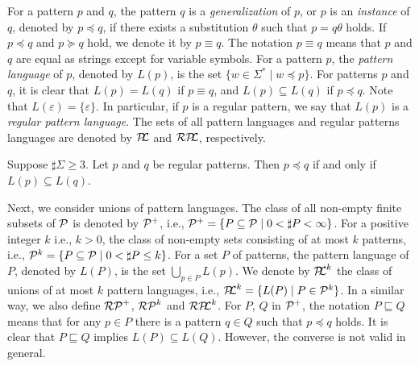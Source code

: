 For a pattern $p$ and $q$,
the pattern $q$ is a \textit{generalization} of $p$, or $p$ is an \textit{instance} of $q$, denoted by $p \preceq q$,
if there exists a substitution $\theta$ such that $p = q\theta$ holds.
If $p \preceq q$ and $p \succeq q$ hold, we denote it by $p \equiv q$.
The notation $p \equiv q$ means that $p$ and $q$ are equal as strings except for variable symbols. 
For a pattern $p$, the \textit{pattern language} of $p$, denoted by $L(p)$, is the set $\{w \in \Sigma^{\ast} \mid w \preceq p\}$.
For patterns $p$ and $q$, it is clear that $L(p) = L(q)$ if $p \equiv q$, and $L(p) \subseteq L(q)$ if $p \preceq q$.
Note that $L(\varepsilon) = \{\varepsilon\}$.
In particular, if $p$ is a regular pattern, we say that $L(p)$ is a \textit{regular pattern language}.
The sets of all pattern languages and regular patterns languages are denoted by $\mathcal{P\!\!L}$ and $\mathcal{RP\!\!L}$, respectively.

\begin{lem}\label{regularPatternEquivalence}
  Suppose $\sharp \Sigma \geq 3$. Let $p$ and $q$ be regular patterns.
  Then $p \preceq q$ if and only if $L(p) \subseteq L(q)$.
\end{lem}

Next, we consider unions of pattern languages. %
The class of all non-empty finite subsets of $\mathcal{P}$ is denoted by $\mathcal{P}^{+}$, i.e.,
$\mathcal{P}^{+} = \{P \subseteq \mathcal{P} \mid 0 < \sharp P < \infty\}$.
For a positive integer $k$ i.e., $k>0$, the class of non-empty sets consisting of at most $k$ patterns, i.e.,
$\mathcal{P}^{k} = \{P \subseteq \mathcal{P} \mid 0< \sharp P \leq k\}$.
For a set $P$ of patterns, the pattern language of $P$, denoted by $L(P)$, is the set $\bigcup_{p \in P}L(p)$.
We denote by $\mathcal{P\!\!L}^{k}$ the class of unions of at most $k$ pattern languages,
i.e., $\mathcal{P\!\!L}^{k} = \{L(P) \mid P \in \mathcal{P}^{k}\}$.
In a similar way, we also define $\mathcal{RP}^{+}$, $\mathcal{RP}^{k}$ and $\mathcal{RP\!\!L}^{k}$.
For $P$, $Q$ in $\mathcal{P}^{+}$,
the notation $P \sqsubseteq Q$ means that for any $p \in P$ there is a pattern $q \in Q$ such that $p \preceq q$ holds.
It is clear that $P \sqsubseteq Q$ implies $L(P) \subseteq L(Q)$.
However, the converse is not valid in general.